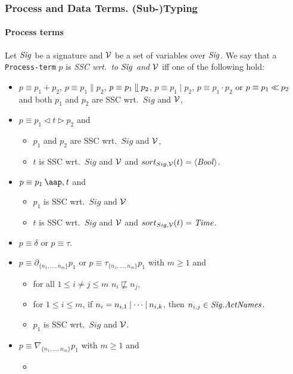 \documentclass[fleqn,a4paper,dvips]{article}
\newcommand{\Sig}{\nm{Sig}}
\newcommand{\NV}{{\cal V}}
\begin{document}
\subsubsection{Process and Data Terms. (Sub-)Typing}

\paragraph{Process terms}
Let $\Sig$ be a signature and $\NV$ be a set of variables over $\Sig$.
We say that a {\tt Process-term} $p$ is {\it SSC wrt.\ to $\Sig$ and
$\NV$} iff one of the following hold:
\begin{itemize}
\item
  $p\equiv p_1+p_2$, 
  $p\equiv p_1\parallel p_2$, $p\equiv p_1\mathbin{\mathrel{\llfloor}} p_2$, $p\equiv p_1\mid
  p_2$,
  $p\equiv p_1 {\cdot} p_2$ or $p\equiv p_1\mathbin{\ll} p_2$ and both $p_1$ and $p_2$ are SSC wrt.\ $Sig$ and $\NV$,
\item
  $p\equiv p_1\triangleleft t \triangleright p_2$ and
  \begin{itemize}
  \item
    $p_1$ and $p_2$ are SSC wrt.\ $Sig$ and $\NV$,
  \item
    $t$ is SSC wrt.\ $Sig$ and $\NV$ and $sort_{Sig,\NV}(t)=\seq{\Bool}$.
  \end{itemize}
\item
  $p\equiv p_1\at{t}$ and 
  \begin{itemize}
\item
  $p_1$ is SSC wrt.\ $Sig$ and $\NV$
\item
  $t$ is SSC wrt.\ $Sig$ and $\NV$ and $sort_{Sig,\NV}(t)=\Time$.
\end{itemize}
\item
  $p\equiv \delta$ or $p\equiv\tau$.
\item
  $p\equiv\partial_{\{n_1,\ldots,n_m\}}p_1$ or
  $p\equiv \tau_{\{n_1,\ldots,n_m\}}p_1$ with $m\geq 1$ and
  \begin{itemize}
\item
  for all $1\leq i\neq j \leq m$ $n_i\not\sqsubseteq n_j$,
\item
  for $1\leq i\leq m$, if $n_i=n_{i,1}\comm\dots\comm n_{i,k}$, then $n_{i,j}\in \Sig.\nm{ActNames}$.
\item
  $p_1$ is SSC wrt.\ $Sig$ and $\NV$.
\end{itemize}
\item
  $p\equiv\nabla_{\{n_1,\ldots,n_m\}}p_1$ with $m\geq 1$ and
  \begin{itemize}
  \item

\end{itemize}
\end{itemize}
\end{document}
